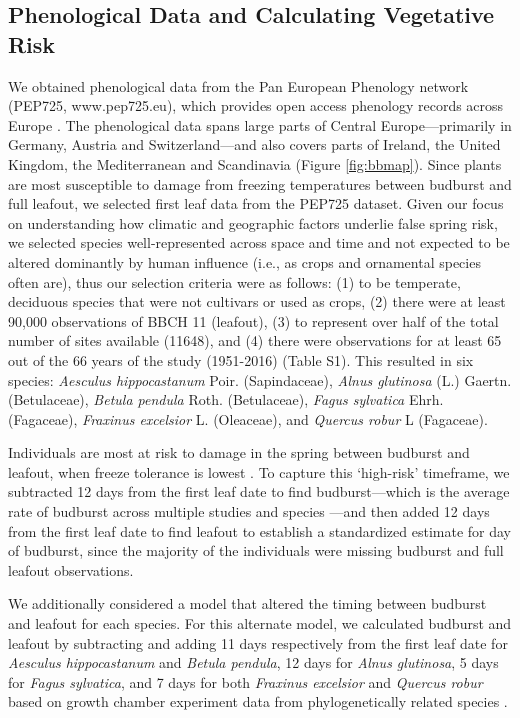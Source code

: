 \documentclass{article}\usepackage[]{graphicx}\usepackage[]{color}
\begin{document}
\subsection*{Phenological Data and Calculating Vegetative Risk}
We obtained phenological data from the Pan European Phenology network (PEP725, www.pep725.eu), which provides open access phenology records across Europe \citep{Templ2018}. The phenological data spans large parts of Central Europe---primarily in Germany, Austria and Switzerland---and also covers parts of Ireland, the United Kingdom, the Mediterranean and Scandinavia (Figure \ref{fig:bbmap}). Since plants are most susceptible to damage from freezing temperatures between budburst and full leafout, we selected first leaf data \citep[i.e., in][BBCH 11, which is defined as the point of leaf unfolding and the first visible leaf stalk]{Meier2001} from the PEP725 dataset. Given our focus on understanding how climatic and geographic factors underlie false spring risk, we selected species well-represented across space and time and not expected to be altered dominantly by human influence (i.e., as crops and ornamental species often are), thus our selection criteria were as follows: (1) to be temperate, deciduous species that were not cultivars or used as crops, (2) there were at least 90,000 observations of BBCH 11 (leafout), (3) to represent over half of the total number of sites available (11648), and (4) there were observations for at least 65 out of the 66 years of the study (1951-2016) (Table S1). This resulted in six species: \textit{Aesculus hippocastanum} Poir. (Sapindaceae), \textit{Alnus glutinosa} (L.) Gaertn. (Betulaceae), \textit{Betula pendula} Roth. (Betulaceae), \textit{Fagus sylvatica} Ehrh. (Fagaceae), \textit{Fraxinus excelsior} L. (Oleaceae), and \textit{Quercus robur} L (Fagaceae). 

Individuals are most at risk to damage in the spring between budburst and leafout, when freeze tolerance is lowest \citep{Sakai1987}. To capture this `high-risk' timeframe, we subtracted 12 days from the first leaf date to find budburst---which is the average rate of budburst across multiple studies and species \citep{Donnelly2017,Flynn2018,NPN2019}---and then added 12 days from the first leaf date to find leafout to establish a standardized estimate for day of budburst, since the majority of the individuals were missing budburst and full leafout observations. 

We additionally considered a model that altered the timing between budburst and leafout for each species. For this alternate model, we calculated budburst and leafout by subtracting and adding 11 days respectively from the first leaf date for \textit{Aesculus hippocastanum} and \textit{Betula pendula}, 12 days for \textit{Alnus glutinosa}, 5 days for \textit{Fagus sylvatica}, and 7 days for both \textit{Fraxinus excelsior} and \textit{Quercus robur} based on growth chamber experiment data from phylogenetically related species \citep{Buerki2010,Wang2016,Hipp2017,Flynn2018}.
\end{document}
